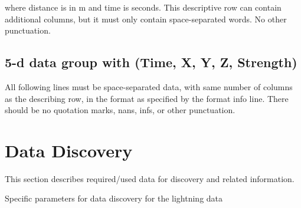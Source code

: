 \documentclass[a4paper,10pt,bibtotoc]{scrartcl}
\begin{document}
where distance is in m and time is seconds. This descriptive row can contain additional columns, but it must only contain space-separated words. No other punctuation.



\subsection{5-d data group with (Time, X, Y, Z, Strength)}
\label{sec:5d}
All following lines must be space-separated data, with same number of columns as the describing row, in the format as specified by the format info line. There should be no quotation marks, nans,  infs, or other punctuation. 







\section{Data Discovery}
This section describes required/used data for discovery and related information.


Specific parameters for data discovery for the lightning data

\end{document}
